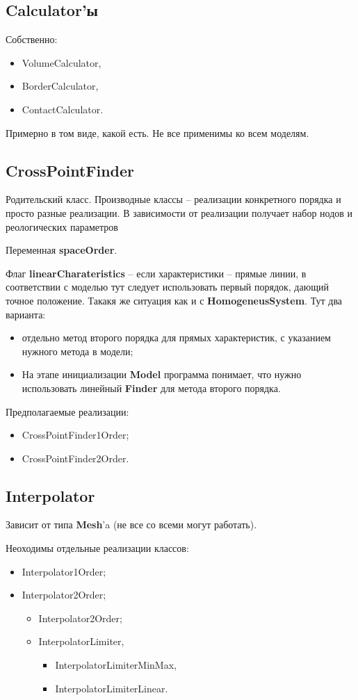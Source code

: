 \documentclass[a4paper,12pt]{article}
\numberwithin{equation}{section}
\begin{document}
\subsection{Calculator'ы}
	Собственно:
	\begin{itemize}
		\item{VolumeCalculator,}
		\item{BorderCalculator,}
		\item{ContactCalculator.}
	\end{itemize}
	Примерно в том виде, какой есть. Не все применимы ко всем моделям.

\subsection{CrossPointFinder}
	Родительский класс. Производные классы -- реализации конкретного порядка и просто разные реализации.
	В зависимости от реализации получает набор нодов и реологических параметров
	
	Переменная \textbf{spaceOrder}.
	
	Флаг \textbf{linearCharateristics} -- если характеристики -- прямые линии, в соответствии с моделью тут следует использовать первый порядок, дающий точное положение. Такакя же ситуация как и с \textbf{HomogeneusSystem}.
	Тут два варианта: 
		\begin{itemize}
			\item{отдельно метод второго порядка для прямых характеристик, с указанием нужного метода в модели;}
			\item{На этапе инициализации \textbf{Model} программа понимает, что нужно использовать линейный \textbf{Finder} для метода второго порядка.}
		\end{itemize}

	Предполагаемые реализации:
		\begin{itemize}
			\item{CrossPointFinder1Order;}
			\item{CrossPointFinder2Order.}
		\end{itemize}

\subsection{Interpolator}
	Зависит от типа \textbf{Mesh}'a (не все со всеми могут работать).
	
	Неоходимы отдельные реализации классов:
	\begin{itemize}
		\item{Interpolator1Order;}
		\item{Interpolator2Order;}
		\begin{itemize}
				\item{Interpolator2Order;}
				\item{InterpolatorLimiter,}
				\begin{itemize}
					\item{InterpolatorLimiterMinMax,}
					\item{InterpolatorLimiterLinear.}
				\end{itemize}
		\end{itemize}
	\end{itemize}
	
\end{document}
